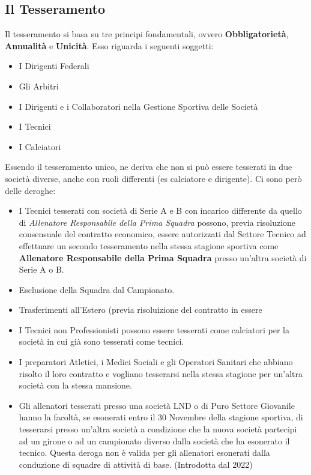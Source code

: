 \documentclass[../uefaC.tex]{subfiles}
\begin{document}
\subsection{Il Tesseramento}
Il tesseramento si basa su tre principi fondamentali, ovvero \textbf{Obbligatorietà}, \textbf{Annualità} e \textbf{Unicità}. Esso riguarda i seguenti soggetti:
\begin{itemize}
    \item I Dirigenti Federali
    \item Gli Arbitri
    \item I Dirigenti e i Collaboratori nella Gestione Sportiva delle Società
    \item I Tecnici
    \item I Calciatori
\end{itemize}
Essendo il tesseramento unico, ne deriva che non si può essere tesserati in due società diverse, anche con ruoli differenti (es calciatore e dirigente). Ci sono però delle deroghe:
\begin{itemize}
    \item I Tecnici tesserati con società di Serie A e B con incarico differente da quello di \emph{Allenatore Responsabile della Prima Squadra} possono, previa risoluzione consensuale del contratto economico, essere autorizzati dal Settore Tecnico ad effettuare un secondo tesseramento nella stessa stagione sportiva come \textbf{Allenatore Responsabile della Prima Squadra} presso un'altra società di Serie A o B.
    \item Esclusione della Squadra dal Campionato.
    \item Trasferimenti all'Estero (previa risoluizione del contratto in essere
    \item I Tecnici non Professionisti possono essere tesserati come calciatori per la società in cui già sono tesserati come tecnici.
    \item I preparatori Atletici, i Medici Sociali e gli Operatori Sanitari che abbiano risolto il loro contratto e vogliano tesserarsi nella stessa stagione per un'altra società con la stessa mansione.
    \item Gli allenatori tesserati presso una società LND o di Puro Settore Giovanile hanno la facoltà, se esonerati entro il 30 Novembre della stagione sportiva, di tesserarsi presso un'altra società a condizione che la nuova società partecipi ad un girone o ad un campionato diverso dalla società che ha esonerato il tecnico. Questa deroga non è valida per gli allenatori esonerati dalla conduzione di squadre di attività di base. (Introdotta dal 2022)
\end{itemize}
\end{document}
